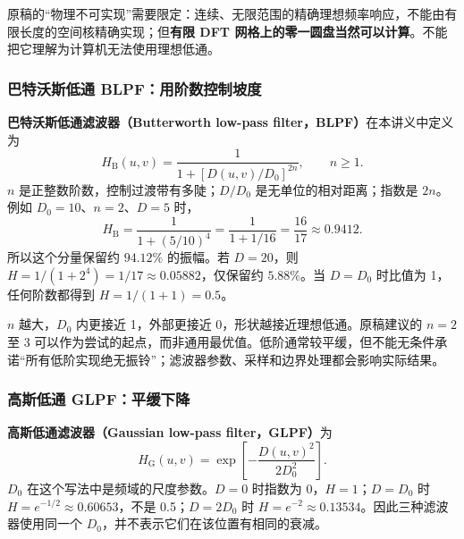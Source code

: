原稿的“物理不可实现”需要限定：连续、无限范围的精确理想频率响应，不能由有限长度的空间核精确实现；但\textbf{有限 DFT 网格上的零一圆盘当然可以计算}。不能把它理解为计算机无法使用理想低通。

\subsubsection{巴特沃斯低通 BLPF：用阶数控制坡度}
\textbf{巴特沃斯低通滤波器（Butterworth low-pass filter，BLPF）}在本讲义中定义为
\[
H_{\mathrm B}(u,v)=\frac{1}{1+\left[D(u,v)/D_0\right]^{2n}},\qquad n\geq1.
\]
$n$ 是正整数阶数，控制过渡带有多陡；$D/D_0$ 是无单位的相对距离；指数是 $2n$。例如 $D_0=10$、$n=2$、$D=5$ 时，
\[
H_{\mathrm B}=\frac{1}{1+(5/10)^4}
=\frac{1}{1+1/16}=\frac{16}{17}\approx0.9412.
\]
所以这个分量保留约 $94.12\%$ 的振幅。若 $D=20$，则 $H=1/(1+2^4)=1/17\approx0.05882$，仅保留约 $5.88\%$。当 $D=D_0$ 时比值为 1，任何阶数都得到 $H=1/(1+1)=0.5$。

$n$ 越大，$D_0$ 内更接近 1，外部更接近 0，形状越接近理想低通。原稿建议的 $n=2$ 至 $3$ 可以作为尝试的起点，而非通用最优值。低阶通常较平缓，但不能无条件承诺“所有低阶实现绝无振铃”；滤波器参数、采样和边界处理都会影响实际结果。

\subsubsection{高斯低通 GLPF：平缓下降}
\textbf{高斯低通滤波器（Gaussian low-pass filter，GLPF）}为
\[
H_{\mathrm G}(u,v)=\exp\!\left[-\frac{D(u,v)^2}{2D_0^2}\right].
\]
$D_0$ 在这个写法中是频域的尺度参数。$D=0$ 时指数为 0，$H=1$；$D=D_0$ 时 $H=e^{-1/2}\approx0.60653$，不是 0.5；$D=2D_0$ 时 $H=e^{-2}\approx0.13534$。因此三种滤波器使用同一个 $D_0$，并不表示它们在该位置有相同的衰减。

\begin{center}
\end{center}

